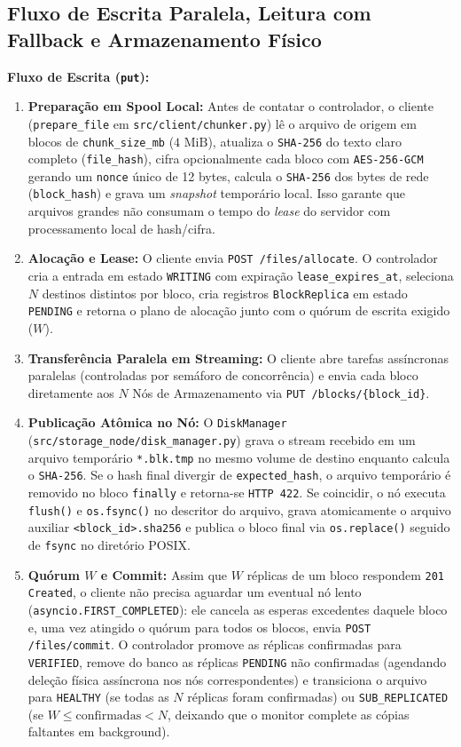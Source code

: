 \documentclass[10pt,a4paper]{article}
\begin{document}
\subsection{Fluxo de Escrita Paralela, Leitura com Fallback e Armazenamento Físico}
\textbf{Fluxo de Escrita (\texttt{put}):}
\begin{enumerate}
    \item \textbf{Preparação em Spool Local:} Antes de contatar o controlador, o cliente (\texttt{prepare\_file} em \texttt{src/client/chunker.py}) lê o arquivo de origem em blocos de \texttt{chunk\_size\_mb} ($4\text{ MiB}$), atualiza o \texttt{SHA-256} do texto claro completo (\texttt{file\_hash}), cifra opcionalmente cada bloco com \texttt{AES-256-GCM} gerando um \texttt{nonce} único de 12 bytes, calcula o \texttt{SHA-256} dos bytes de rede (\texttt{block\_hash}) e grava um \textit{snapshot} temporário local. Isso garante que arquivos grandes não consumam o tempo do \textit{lease} do servidor com processamento local de hash/cifra.
    \item \textbf{Alocação e Lease:} O cliente envia \texttt{POST /files/allocate}. O controlador cria a entrada em estado \texttt{WRITING} com expiração \texttt{lease\_expires\_at}, seleciona $N$ destinos distintos por bloco, cria registros \texttt{BlockReplica} em estado \texttt{PENDING} e retorna o plano de alocação junto com o quórum de escrita exigido ($W$).
    \item \textbf{Transferência Paralela em Streaming:} O cliente abre tarefas assíncronas paralelas (controladas por semáforo de concorrência) e envia cada bloco diretamente aos $N$ Nós de Armazenamento via \texttt{PUT /blocks/\{block\_id\}}.
    \item \textbf{Publicação Atômica no Nó:} O \texttt{DiskManager} (\texttt{src/storage\_node/disk\_manager.py}) grava o stream recebido em um arquivo temporário \texttt{*.blk.tmp} no mesmo volume de destino enquanto calcula o \texttt{SHA-256}. Se o hash final divergir de \texttt{expected\_hash}, o arquivo temporário é removido no bloco \texttt{finally} e retorna-se \texttt{HTTP 422}. Se coincidir, o nó executa \texttt{flush()} e \texttt{os.fsync()} no descritor do arquivo, grava atomicamente o arquivo auxiliar \texttt{<block\_id>.sha256} e publica o bloco final via \texttt{os.replace()} seguido de \texttt{fsync} no diretório POSIX.
    \item \textbf{Quórum $W$ e Commit:} Assim que $W$ réplicas de um bloco respondem \texttt{201 Created}, o cliente não precisa aguardar um eventual nó lento (\texttt{asyncio.FIRST\_COMPLETED}): ele cancela as esperas excedentes daquele bloco e, uma vez atingido o quórum para todos os blocos, envia \texttt{POST /files/commit}. O controlador promove as réplicas confirmadas para \texttt{VERIFIED}, remove do banco as réplicas \texttt{PENDING} não confirmadas (agendando deleção física assíncrona nos nós correspondentes) e transiciona o arquivo para \texttt{HEALTHY} (se todas as $N$ réplicas foram confirmadas) ou \texttt{SUB\_REPLICATED} (se $W \le \text{confirmadas} < N$, deixando que o monitor complete as cópias faltantes em background).
\end{enumerate}
\end{document}

